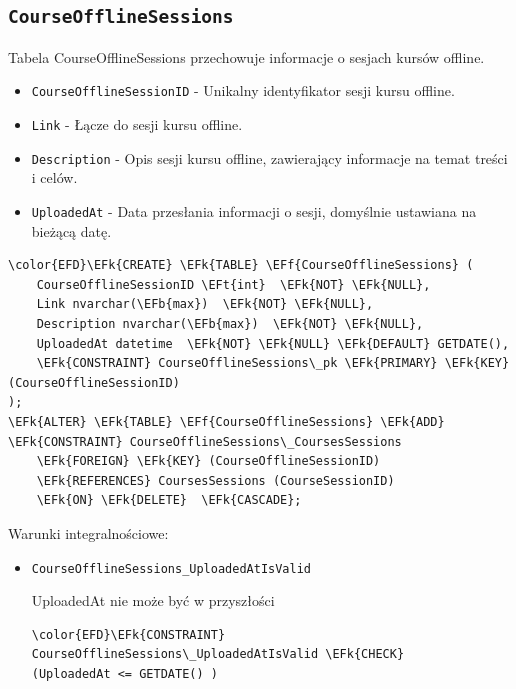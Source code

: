 \documentclass[11pt]{article}
\newcommand{\EFk}[1]{\textcolor{EFk}{\textbf{#1}}} %
\newcommand{\EFb}[1]{\textcolor{EFb}{\textbf{#1}}} %
\newcommand{\EFf}[1]{\textcolor{EFf}{#1}} %
\newcommand{\EFt}[1]{\textcolor{EFt}{\textbf{#1}}} %
\begin{document}
\subsection{\texttt{CourseOfflineSessions}}
\label{sec:org68f4fa0}
Tabela CourseOfflineSessions przechowuje informacje o sesjach kursów offline.
\begin{itemize}
\item \texttt{CourseOfflineSessionID} - Unikalny identyfikator sesji kursu offline.
\item \texttt{Link} - Łącze do sesji kursu offline.
\item \texttt{Description} - Opis sesji kursu offline, zawierający informacje na temat treści i celów.
\item \texttt{UploadedAt} - Data przesłania informacji o sesji, domyślnie ustawiana na bieżącą datę.
\end{itemize}
\begin{Code}
\begin{Verbatim}
\color{EFD}\EFk{CREATE} \EFk{TABLE} \EFf{CourseOfflineSessions} (
    CourseOfflineSessionID \EFt{int}  \EFk{NOT} \EFk{NULL},
    Link nvarchar(\EFb{max})  \EFk{NOT} \EFk{NULL},
    Description nvarchar(\EFb{max})  \EFk{NOT} \EFk{NULL},
    UploadedAt datetime  \EFk{NOT} \EFk{NULL} \EFk{DEFAULT} GETDATE(),
    \EFk{CONSTRAINT} CourseOfflineSessions\_pk \EFk{PRIMARY} \EFk{KEY}  (CourseOfflineSessionID)
);
\EFk{ALTER} \EFk{TABLE} \EFf{CourseOfflineSessions} \EFk{ADD} \EFk{CONSTRAINT} CourseOfflineSessions\_CoursesSessions
    \EFk{FOREIGN} \EFk{KEY} (CourseOfflineSessionID)
    \EFk{REFERENCES} CoursesSessions (CourseSessionID)
    \EFk{ON} \EFk{DELETE}  \EFk{CASCADE};
\end{Verbatim}
\end{Code}
Warunki integralnościowe:


\begin{itemize}
\item \texttt{CourseOfflineSessions\_UploadedAtIsValid}

UploadedAt nie może być w przyszłości
\begin{Code}
\begin{Verbatim}
\color{EFD}\EFk{CONSTRAINT} CourseOfflineSessions\_UploadedAtIsValid \EFk{CHECK}
(UploadedAt <= GETDATE() )
\end{Verbatim}
\end{Code}
\end{itemize}
\end{document}
